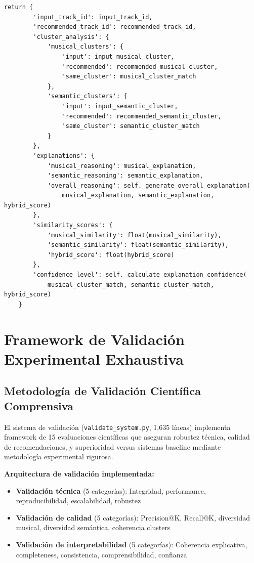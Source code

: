 \documentclass[12pt,a4paper]{article}
\begin{document}
\begin{lstlisting}[caption={Generación Automática de Explicaciones Comprensivas}]
    return {
        'input_track_id': input_track_id,
        'recommended_track_id': recommended_track_id,
        'cluster_analysis': {
            'musical_clusters': {
                'input': input_musical_cluster,
                'recommended': recommended_musical_cluster,
                'same_cluster': musical_cluster_match
            },
            'semantic_clusters': {
                'input': input_semantic_cluster,
                'recommended': recommended_semantic_cluster,
                'same_cluster': semantic_cluster_match
            }
        },
        'explanations': {
            'musical_reasoning': musical_explanation,
            'semantic_reasoning': semantic_explanation,
            'overall_reasoning': self._generate_overall_explanation(
                musical_explanation, semantic_explanation, hybrid_score)
        },
        'similarity_scores': {
            'musical_similarity': float(musical_similarity),
            'semantic_similarity': float(semantic_similarity),
            'hybrid_score': float(hybrid_score)
        },
        'confidence_level': self._calculate_explanation_confidence(
            musical_cluster_match, semantic_cluster_match, hybrid_score)
    }
\end{lstlisting}

\section{Framework de Validación Experimental Exhaustiva}

\subsection{Metodología de Validación Científica Comprensiva}

El sistema de validación (\texttt{validate\_system.py}, 1,635 líneas) implementa framework de 15 evaluaciones científicas que aseguran robustez técnica, calidad de recomendaciones, y superioridad versus sistemas baseline mediante metodología experimental rigurosa.

\textbf{Arquitectura de validación implementada:}
\begin{itemize}
    \item \textbf{Validación técnica} (5 categorías): Integridad, performance, reproducibilidad, escalabilidad, robustez
    \item \textbf{Validación de calidad} (5 categorías): Precision@K, Recall@K, diversidad musical, diversidad semántica, coherencia clusters
    \item \textbf{Validación de interpretabilidad} (5 categorías): Coherencia explicativa, completeness, consistencia, comprensibilidad, confianza
\end{itemize}
\end{document}
